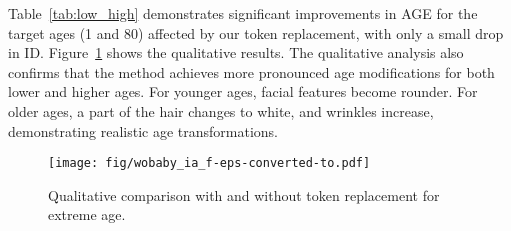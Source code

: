 \begin{table}[t]
  \centering
  \caption{
    Quantitative comparison with and without token replacement for extreme age. 
    }
  \label{tab:low_high}
\end{table}

Table~\ref{tab:low_high} demonstrates significant improvements in AGE for the target ages (1 and 80) affected by our token replacement, with only a small drop in ID.
Figure~\ref{fig:low_high} shows the qualitative results.
The qualitative analysis also confirms that the method achieves more pronounced age modifications for both lower and higher ages.
For younger ages, facial features become rounder. 
For older ages, a part of the hair changes to white, and wrinkles increase, demonstrating realistic age transformations.

\begin{figure}
  \centering
  \texttt{[image: fig/wobaby\_ia\_f-eps-converted-to.pdf]}
  \caption{
  Qualitative comparison with and without token replacement for extreme age. 
  }
  \label{fig:low_high}
\end{figure}
